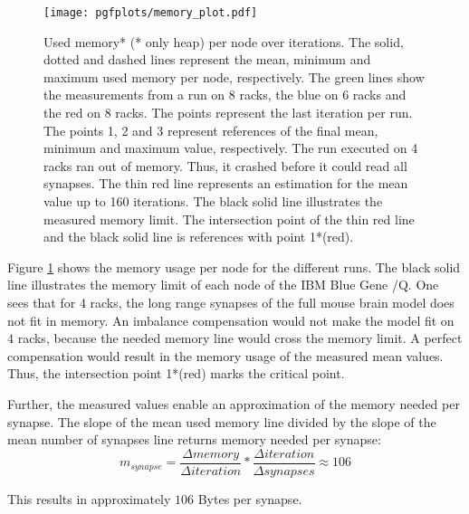 \begin{figure}[h!]
\begin{center}
 \texttt{[image: pgfplots/memory\_plot.pdf]}
\end{center}
\caption{Used memory* (* only heap) per node over iterations.
The solid, dotted and dashed lines represent the mean, minimum and maximum used memory per node, respectively.
The green lines show the measurements from a run on 8 racks, the blue on 6 racks and the red on 8 racks.
The points represent the last iteration per run.
The points 1, 2 and 3 represent references of the final mean, minimum and maximum value, respectively.
The run executed on 4 racks ran out of memory. Thus, it crashed before it could read all synapses.
The thin red line represents an estimation for the mean value up to 160 iterations.
The black solid line illustrates the measured memory limit.
The intersection point of the thin red line and the black solid line is references with point 1*(red).
 }
\label{fig:memoryplot}
\end{figure}
Figure \ref{fig:memoryplot} shows the memory usage per node for the different runs.
The black solid line illustrates the memory limit of each node of the IBM Blue Gene /Q.
One sees that for 4 racks, the long range synapses of the full mouse brain model does not fit in memory.
An imbalance compensation would not make the model fit on $4$ racks,
because the needed memory line would cross the memory limit.
A perfect compensation would result in the memory usage of the measured mean values.
Thus, the intersection point 1*(red) marks the critical point.

Further, the measured values enable an approximation of the memory needed per synapse.
The slope of the mean used memory line divided by the slope of the mean number of synapses line returns
memory needed per synapse:
\begin{equation}
	m_{synapse} = \frac{\Delta memory}{\Delta iteration} * \frac{\Delta iteration}{\Delta synapses} \approx 106
\end{equation}

This results in approximately $106$ Bytes per synapse.




